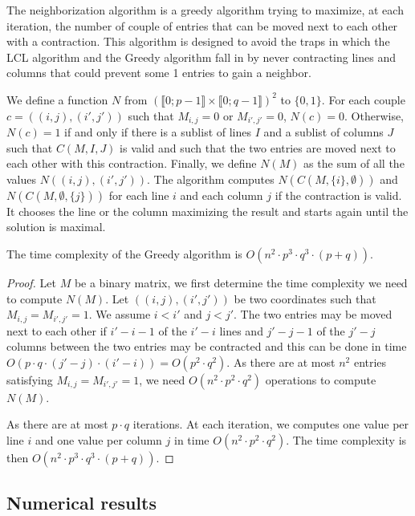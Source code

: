 The neighborization algorithm is a greedy algorithm trying to maximize, at each iteration, the number of couple of entries that can be moved next to each other with a contraction. This algorithm is designed to avoid the traps in which the LCL algorithm and the Greedy algorithm fall in by never contracting lines and columns that could prevent some 1 entries to gain a neighbor.

We define a function $N$ from $(\llbracket 0;p-1 \rrbracket \times \llbracket 0;q-1 \rrbracket)^2$ to $\{0,1\}$.
For each couple $c = ((i,j),(i',j'))$ such that $M_{i,j} = 0$ or $M_{i',j'} = 0$, $N(c) = 0$. Otherwise, $N(c) = 1$ if and only if there is a sublist of lines $I$ and a sublist of columns $J$ such that $C(M,I,J)$ is valid and such that the two entries are moved next to each other with this contraction. Finally, we define $N(M)$ as the sum of all the values $N((i,j),(i',j'))$. The algorithm computes $N(C(M,\{i\},\emptyset))$ and $N(C(M,\emptyset, \{j\}))$ for each line $i$ and each column $j$ if the contraction is valid. It chooses the line or the column maximizing the result and starts again until the solution is maximal.

\begin{theorem}
	The time complexity of the Greedy algorithm is $O(n^2 \cdot p^3 \cdot q^3 \cdot (p+q))$. 
\end{theorem}
\begin{proof}
	Let $M$ be a binary matrix, we first determine the time complexity we need to compute $N(M)$. Let $((i,j),(i',j'))$ be two coordinates such that $M_{i,j} = M_{i',j'} = 1$. We assume $i < i'$ and $j < j'$. The two entries may be moved next to each other if $i'- i -1$ of the $i'-i$ lines and $j'- j -1$ of the $j'-j$ columns between the two entries may be contracted and this can be done in time $O(p \cdot q \cdot (j'-j) \cdot (i'-i)) = O(p^2 \cdot q^2)$. As there are at most $n^2$ entries satisfying $M_{i,j} = M_{i',j'} = 1$, we need $O(n^2 \cdot p^2 \cdot q^2)$ operations to compute $N(M)$.  
	
	As there are at most $p \cdot q$ iterations. At each iteration, we computes one value per line $i$ and one value per column $j$ in time $O(n^2 \cdot p^2 \cdot q^2)$. The time complexity is then $O(n^2 \cdot p^3 \cdot q^3 \cdot (p+q))$.
\end{proof}

\subsection{Numerical results}

